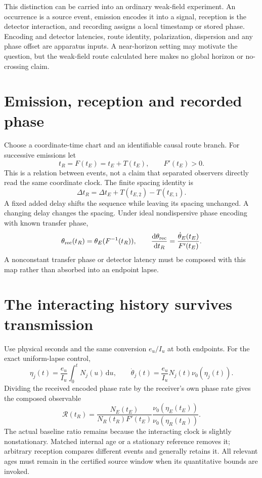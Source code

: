 \documentclass[10pt,twocolumn,letterpaper]{article}
\newcommand{\dd}{\mathrm{d}}
\begin{document}
This distinction can be carried into an ordinary weak-field experiment. An occurrence is a source event, emission encodes it into a signal, reception is the detector interaction, and recording assigns a local timestamp or stored phase. Encoding and detector latencies, route identity, polarization, dispersion and any phase offset are apparatus inputs. A near-horizon setting may motivate the question, but the weak-field route calculated here makes no global horizon or no-crossing claim.

\section{Emission, reception and recorded phase}
Choose a coordinate-time chart and an identifiable causal route branch. For successive emissions let
\[
 t_R=F(t_E)=t_E+T(t_E),\qquad F'(t_E)>0.
\]
This is a relation between events, not a claim that separated observers directly read the same coordinate clock. The finite spacing identity is
\[
 \Delta t_R=\Delta t_E+T(t_{E,2})-T(t_{E,1}).
\]
A fixed added delay shifts the sequence while leaving its spacing unchanged. A changing delay changes the spacing. Under ideal nondispersive phase encoding with known transfer phase,
\[
 \theta_{\rm rec}(t_R)=\theta_E(F^{-1}(t_R)),\qquad
 \frac{\dd\theta_{\rm rec}}{\dd t_R}=\frac{\dot\theta_E(t_E)}{F'(t_E)}.
\]
A nonconstant transfer phase or detector latency must be composed with this map rather than absorbed into an endpoint lapse.

\section{The interacting history survives transmission}
Use physical seconds and the same conversion $e_u/I_u$ at both endpoints. For the exact uniform-lapse control,
\[
 \eta_j(t)=\frac{e_u}{I_u}\int_0^t N_j(u)\,\dd u,\qquad
 \dot\theta_j(t)=\frac{e_u}{I_u}N_j(t)\nu_0(\eta_j(t)).
\]
Dividing the received encoded phase rate by the receiver's own phase rate gives the composed observable
\begin{equation}
 \mathcal R(t_R)=
 \frac{N_E(t_E)}{N_R(t_R)F'(t_E)}
 \frac{\nu_0(\eta_E(t_E))}{\nu_0(\eta_R(t_R))}.
 \label{eq:composed-observable}
\end{equation}
The actual baseline ratio remains because the interacting clock is slightly nonstationary. Matched internal age or a stationary reference removes it; arbitrary reception compares different events and generally retains it. All relevant ages must remain in the certified source window when its quantitative bounds are invoked.
\end{document}
